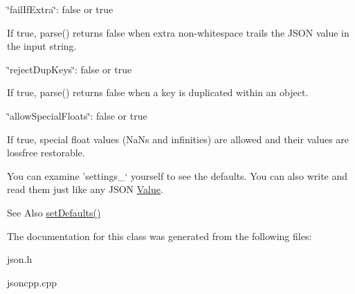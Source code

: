 \begin{DoxyItemize}
\begin{DoxyItemize}
\end{DoxyItemize}
\item {\ttfamily \char`\"{}fail\-If\-Extra\char`\"{}\-: false or true}
\begin{DoxyItemize}
\item If true, {\ttfamily parse()} returns false when extra non-\/whitespace trails the J\-S\-O\-N value in the input string.
\end{DoxyItemize}
\item {\ttfamily \char`\"{}reject\-Dup\-Keys\char`\"{}\-: false or true}
\begin{DoxyItemize}
\item If true, {\ttfamily parse()} returns false when a key is duplicated within an object.
\end{DoxyItemize}
\item {\ttfamily \char`\"{}allow\-Special\-Floats\char`\"{}\-: false or true}
\begin{DoxyItemize}
\item If true, special float values (Na\-Ns and infinities) are allowed and their values are lossfree restorable.
\end{DoxyItemize}
\end{DoxyItemize}

You can examine 'settings\-\_\-` yourself to see the defaults. You can also write and read them just like any J\-S\-O\-N \hyperlink{class_json_1_1_value}{Value}. \begin{DoxySeeAlso}{See Also}
\hyperlink{class_json_1_1_char_reader_builder_a03ff031e06aabff989ab4addc87294ab}{set\-Defaults()} 
\end{DoxySeeAlso}


The documentation for this class was generated from the following files\-:\begin{DoxyCompactItemize}
\item 
json.\-h\item 
jsoncpp.\-cpp\end{DoxyCompactItemize}
